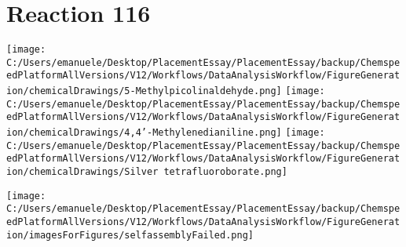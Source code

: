 \documentclass{article}%
\begin{document}
\section*{Reaction 116}%
%
\begin{scheme}[H]%
\begin{minipage}{0.5\textwidth}%
\texttt{[image: C:/Users/emanuele/Desktop/PlacementEssay/PlacementEssay/backup/ChemspeedPlatformAllVersions/V12/Workflows/DataAnalysisWorkflow/FigureGeneration/chemicalDrawings/5-Methylpicolinaldehyde.png]}%
\texttt{[image: C:/Users/emanuele/Desktop/PlacementEssay/PlacementEssay/backup/ChemspeedPlatformAllVersions/V12/Workflows/DataAnalysisWorkflow/FigureGeneration/chemicalDrawings/4,4'-Methylenedianiline.png]}%
\texttt{[image: C:/Users/emanuele/Desktop/PlacementEssay/PlacementEssay/backup/ChemspeedPlatformAllVersions/V12/Workflows/DataAnalysisWorkflow/FigureGeneration/chemicalDrawings/Silver tetrafluoroborate.png]}%
\end{minipage}%
\begin{minipage}{0.5\textwidth}%
\begin{center}%
\texttt{[image: C:/Users/emanuele/Desktop/PlacementEssay/PlacementEssay/backup/ChemspeedPlatformAllVersions/V12/Workflows/DataAnalysisWorkflow/FigureGeneration/imagesForFigures/selfassemblyFailed.png]}%
\end{center}%
\end{minipage}%
\caption{Self-assembly of components 3, 17, with Silver(I) in a 3.0:1.5:1.0 molar ratio in CH$_3$CN at 60\textdegree C for 40h. These are the reagents (starting materials) for reaction 116.}%
\end{scheme}%
\end{document}
